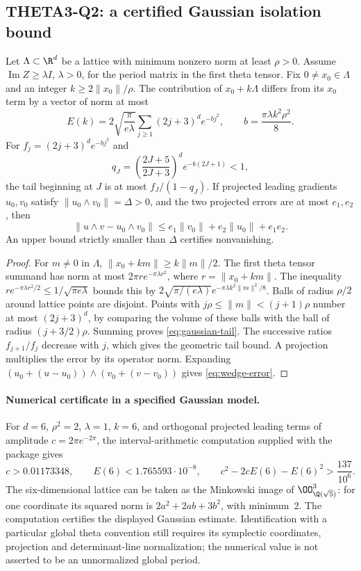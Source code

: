 \subsection{THETA3-Q2: a certified Gaussian isolation bound}\label{Q2}
Let $\Lambda\subset\R^d$ be a lattice with minimum nonzero norm at least $\rho>0$. Assume $\operatorname{Im}Z\geq\lambda I$, $\lambda>0$, for the period matrix in the first theta tensor. Fix $0\ne x_0\in\Lambda$ and an integer $k\geq2\|x_0\|/\rho$. The contribution of $x_0+k\Lambda$ differs from its $x_0$ term by a vector of norm at most
\begin{equation}\label{eq:gaussian-tail}
 E(k)=2\sqrt{\frac{\pi}{e\lambda}}
 \sum_{j\geq1}(2j+3)^d e^{-b j^2},
 \qquad b=\frac{\pi\lambda k^2\rho^2}{8}.
\end{equation}
For $f_j=(2j+3)^d e^{-bj^2}$ and
\[
 q_J=\left(\frac{2J+5}{2J+3}\right)^d e^{-b(2J+1)}<1,
\]
the tail beginning at $J$ is at most $f_J/(1-q_J)$.
If projected leading gradients $u_0,v_0$ satisfy
$\|u_0\wedge v_0\|=\Delta>0$, and the two projected errors are at most $e_1,e_2$, then
\begin{equation}\label{eq:wedge-error}
 \|u\wedge v-u_0\wedge v_0\|
 \leq e_1\|v_0\|+e_2\|u_0\|+e_1e_2.
\end{equation}
An upper bound strictly smaller than $\Delta$ certifies nonvanishing.
\begin{proof}
For $m\ne0$ in $\Lambda$, $\|x_0+km\|\geq k\|m\|/2$.
The first theta tensor summand has norm at most $2\pi r e^{-\pi\lambda r^2}$, where $r=\|x_0+km\|$. The inequality
$r e^{-\pi\lambda r^2/2}\leq1/\sqrt{\pi e\lambda}$ bounds this by
$2\sqrt{\pi/(e\lambda)}e^{-\pi\lambda k^2\|m\|^2/8}$.
Balls of radius $\rho/2$ around lattice points are disjoint. Points with
$j\rho\leq\|m\|<(j+1)\rho$ number at most $(2j+3)^d$, by comparing the volume of these balls with the ball of radius $(j+3/2)\rho$. Summing proves \eqref{eq:gaussian-tail}. The successive ratios $f_{j+1}/f_j$ decrease with $j$, which gives the geometric tail bound. A projection multiplies the error by its operator norm. Expanding
$(u_0+(u-u_0))\wedge(v_0+(v-v_0))$ gives \eqref{eq:wedge-error}.
\end{proof}
\paragraph{Numerical certificate in a specified Gaussian model.}
For $d=6$, $\rho^2=2$, $\lambda=1$, $k=6$, and orthogonal projected leading terms of amplitude $c=2\pi e^{-2\pi}$, the interval-arithmetic computation supplied with the package gives
\[
 c>0.01173348,\qquad E(6)<1.765593\cdot10^{-8},
 \qquad c^2-2cE(6)-E(6)^2>\frac{137}{10^6}.
\]
The six-dimensional lattice can be taken as the Minkowski image of
$\OO_{\Q(\sqrt5)}^3$: for one coordinate its squared norm is
$2a^2+2ab+3b^2$, with minimum~2. The computation certifies the displayed Gaussian estimate. Identification with a particular global theta convention still requires its symplectic coordinates, projection and determinant-line normalization; the numerical value is not asserted to be an unnormalized global period.

